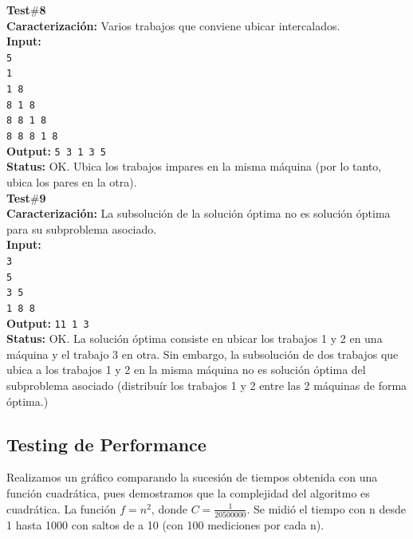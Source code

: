 \noindent\textbf{Test$\#$8}\\
\textbf{Caracterización:} Varios trabajos que conviene ubicar intercalados.\\
\textbf{Input:}\\ \texttt{5\\1\\1 8\\8 1 8\\8 8 1 8\\8 8 8 1 8}\\
\textbf{Output:} \texttt{5 3 1 3 5}\\
\textbf{Status:} OK. Ubica los trabajos impares en la misma máquina (por lo
tanto, ubica los pares en la otra).\\

\noindent\textbf{Test$\#$9}\\
\textbf{Caracterización:} La subsolución de la solución óptima no es solución
óptima para su subproblema asociado.\\
\textbf{Input:}\\ \texttt{3\\5\\3 5\\1 8 8}\\
\textbf{Output:} \texttt{11 1 3}\\
\textbf{Status:} OK. La solución óptima consiste en ubicar los trabajos 1 y 2 en
una máquina y el trabajo 3 en otra. Sin embargo, la subsolución de dos trabajos
que ubica a los trabajos 1 y 2 en la misma máquina no es solución óptima del
subproblema asociado (distribuír los trabajos 1 y 2 entre las 2 máquinas de
forma óptima.)\\

\newpage
\subsection{Testing de Performance}

\par{Realizamos un gráfico comparando la sucesión de tiempos obtenida con una función cuadrática, pues demostramos que la complejidad del algoritmo es cuadrática.
La función $f = n^2$, donde $C = \frac{1}{20500000}$. Se midió el tiempo con n desde 1 hasta 1000 con saltos de a 10 (con 100 mediciones por cada n).}


